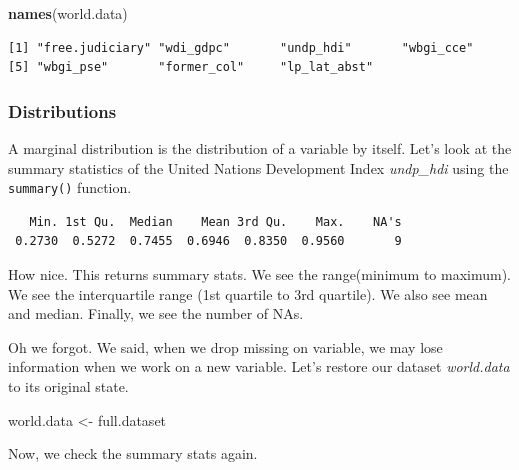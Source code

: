 \documentclass[]{article}
\newenvironment{Shaded}{\begin{snugshade}}{\end{snugshade}}
\newcommand{\KeywordTok}[1]{\textcolor[rgb]{0.13,0.29,0.53}{\textbf{#1}}}
\newcommand{\StringTok}[1]{\textcolor[rgb]{0.31,0.60,0.02}{#1}}
\newcommand{\OperatorTok}[1]{\textcolor[rgb]{0.81,0.36,0.00}{\textbf{#1}}}
\newcommand{\NormalTok}[1]{#1}
\theoremstyle{definition}
\theoremstyle{definition}
\theoremstyle{definition}
\theoremstyle{remark}
\begin{document}
\begin{Shaded}
\begin{Highlighting}[]
\KeywordTok{names}\NormalTok{(world.data)}
\end{Highlighting}
\end{Shaded}

\begin{verbatim}
[1] "free.judiciary" "wdi_gdpc"       "undp_hdi"       "wbgi_cce"      
[5] "wbgi_pse"       "former_col"     "lp_lat_abst"   
\end{verbatim}

\subsubsection{Distributions}\label{distributions}

A marginal distribution is the distribution of a variable by itself.
Let's look at the summary statistics of the United Nations Development
Index \emph{undp\_hdi} using the \texttt{summary()} function.

\begin{Shaded}
\end{Shaded}

\begin{verbatim}
   Min. 1st Qu.  Median    Mean 3rd Qu.    Max.    NA's 
 0.2730  0.5272  0.7455  0.6946  0.8350  0.9560       9 
\end{verbatim}

How nice. This returns summary stats. We see the range(minimum to
maximum). We see the interquartile range (1st quartile to 3rd quartile).
We also see mean and median. Finally, we see the number of NAs.

Oh we forgot. We said, when we drop missing on variable, we may lose
information when we work on a new variable. Let's restore our dataset
\emph{world.data} to its original state.

\begin{Shaded}
\begin{Highlighting}[]
\NormalTok{world.data <-}\StringTok{ }\NormalTok{full.dataset}
\end{Highlighting}
\end{Shaded}

Now, we check the summary stats again.

\begin{Shaded}
\end{Shaded}
\end{document}
